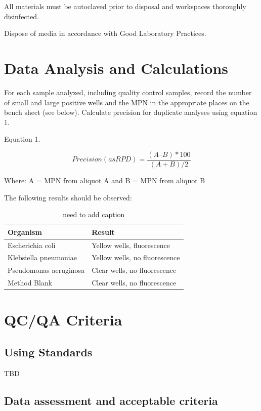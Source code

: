 \documentclass[12pt]{../SOP4_alpha}\usepackage[]{graphicx}\usepackage[]{xcolor}
\begin{document}
\NP All materials must be autoclaved prior to disposal and workspaces
thoroughly disinfected.

\NP Dispose of media in accordance with Good Laboratory Practices.

\section{Data Analysis and Calculations}

\NP For each sample analyzed, including quality control samples, record
the number of small and large positive wells and the MPN in the
appropriate places on the bench sheet (see below). Calculate
precision for duplicate analyses using equation 1.

\NP Equation 1. 

\begin{equation}
Precision (as RPD) = \frac{(A – B)*100}{(A + B)/2}
\end{equation}

Where: A = MPN from aliquot A and
 B = MPN from aliquot B 

\NP The following results should be observed:


\begin{table}
\caption{need to add caption}
		\begin{tabular}{ll}\hline

Organism                &  Result \\ \hline \hline
Escherichia coli        & Yellow wells, fluorescence \\
Klebsiella pneumoniae   & Yellow wells, no fluorescence \\
Pseudomonas aeruginosa  & Clear wells, no fluorescence \\
Method Blank            & Clear wells, no fluorescence \\ \hline
  \end{tabular}
\end{table}


\section{QC/QA Criteria}

\subsection{Using Standards}

\NP TBD

\subsection{Data assessment and acceptable criteria}
\end{document}
